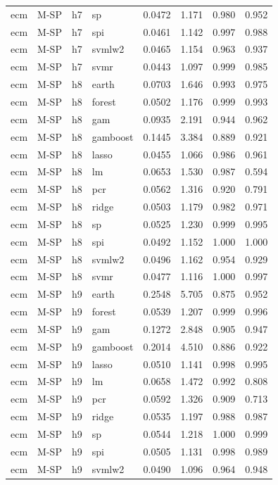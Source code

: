 \begin{ThreePartTable}
\begin{longtable}[t]{llclcccc}
ecm & M-SP & h7 & sp & 0.0472 & 1.171 & 0.980 & 0.952\\
ecm & M-SP & h7 & spi & 0.0461 & 1.142 & 0.997 & 0.988\\
ecm & M-SP & h7 & svmlw2 & 0.0465 & 1.154 & 0.963 & 0.937\\
ecm & M-SP & h7 & svmr & 0.0443 & 1.097 & 0.999 & 0.985\\
\addlinespace
ecm & M-SP & h8 & earth & 0.0703 & 1.646 & 0.993 & 0.975\\
ecm & M-SP & h8 & forest & 0.0502 & 1.176 & 0.999 & 0.993\\
ecm & M-SP & h8 & gam & 0.0935 & 2.191 & 0.944 & 0.962\\
ecm & M-SP & h8 & gamboost & 0.1445 & 3.384 & 0.889 & 0.921\\
ecm & M-SP & h8 & lasso & 0.0455 & 1.066 & 0.986 & 0.961\\
ecm & M-SP & h8 & lm & 0.0653 & 1.530 & 0.987 & 0.594\\
ecm & M-SP & h8 & pcr & 0.0562 & 1.316 & 0.920 & 0.791\\
ecm & M-SP & h8 & ridge & 0.0503 & 1.179 & 0.982 & 0.971\\
ecm & M-SP & h8 & sp & 0.0525 & 1.230 & 0.999 & 0.995\\
ecm & M-SP & h8 & spi & 0.0492 & 1.152 & 1.000 & 1.000\\
ecm & M-SP & h8 & svmlw2 & 0.0496 & 1.162 & 0.954 & 0.929\\
ecm & M-SP & h8 & svmr & 0.0477 & 1.116 & 1.000 & 0.997\\
\addlinespace
ecm & M-SP & h9 & earth & 0.2548 & 5.705 & 0.875 & 0.952\\
ecm & M-SP & h9 & forest & 0.0539 & 1.207 & 0.999 & 0.996\\
ecm & M-SP & h9 & gam & 0.1272 & 2.848 & 0.905 & 0.947\\
ecm & M-SP & h9 & gamboost & 0.2014 & 4.510 & 0.886 & 0.922\\
ecm & M-SP & h9 & lasso & 0.0510 & 1.141 & 0.998 & 0.995\\
ecm & M-SP & h9 & lm & 0.0658 & 1.472 & 0.992 & 0.808\\
ecm & M-SP & h9 & pcr & 0.0592 & 1.326 & 0.909 & 0.713\\
ecm & M-SP & h9 & ridge & 0.0535 & 1.197 & 0.988 & 0.987\\
ecm & M-SP & h9 & sp & 0.0544 & 1.218 & 1.000 & 0.999\\
ecm & M-SP & h9 & spi & 0.0505 & 1.131 & 0.998 & 0.989\\
ecm & M-SP & h9 & svmlw2 & 0.0490 & 1.096 & 0.964 & 0.948\\

\end{longtable}
\end{ThreePartTable}

